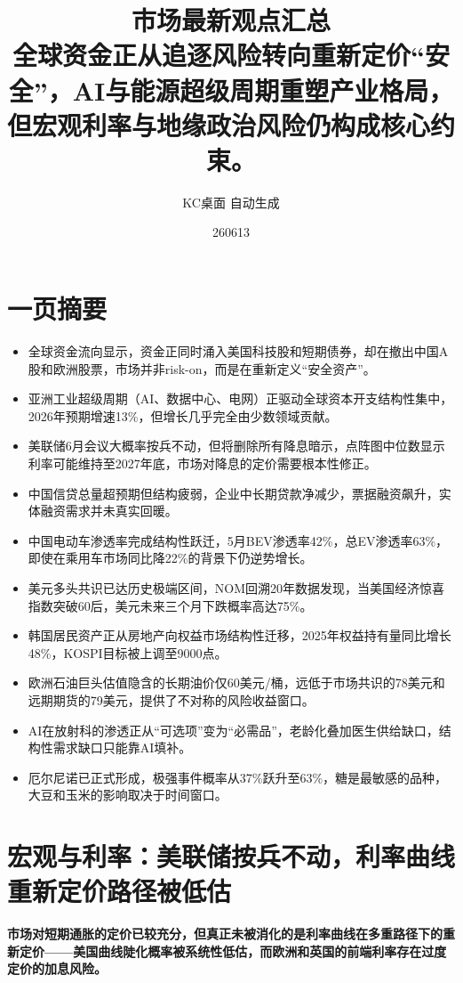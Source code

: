 \documentclass[11pt]{ctexart}
\title{\textbf{市场最新观点汇总}\\[0.4em]{\large 全球资金正从追逐风险转向重新定价“安全”，AI与能源超级周期重塑产业格局，但宏观利率与地缘政治风险仍构成核心约束。}}
\author{KC桌面 自动生成}
\date{260613}
\begin{document}
\maketitle
\tableofcontents
\newpage
\section{一页摘要}
\begin{itemize}
  \item 全球资金流向显示，资金正同时涌入美国科技股和短期债券，却在撤出中国A股和欧洲股票，市场并非risk-on，而是在重新定义“安全资产”。
  \item 亚洲工业超级周期（AI、数据中心、电网）正驱动全球资本开支结构性集中，2026年预期增速13\%，但增长几乎完全由少数领域贡献。
  \item 美联储6月会议大概率按兵不动，但将删除所有降息暗示，点阵图中位数显示利率可能维持至2027年底，市场对降息的定价需要根本性修正。
  \item 中国信贷总量超预期但结构疲弱，企业中长期贷款净减少，票据融资飙升，实体融资需求并未真实回暖。
  \item 中国电动车渗透率完成结构性跃迁，5月BEV渗透率42\%，总EV渗透率63\%，即使在乘用车市场同比降22\%的背景下仍逆势增长。
  \item 美元多头共识已达历史极端区间，NOM回溯20年数据发现，当美国经济惊喜指数突破60后，美元未来三个月下跌概率高达75\%。
  \item 韩国居民资产正从房地产向权益市场结构性迁移，2025年权益持有量同比增长48\%，KOSPI目标被上调至9000点。
  \item 欧洲石油巨头估值隐含的长期油价仅60美元/桶，远低于市场共识的78美元和远期期货的79美元，提供了不对称的风险收益窗口。
  \item AI在放射科的渗透正从“可选项”变为“必需品”，老龄化叠加医生供给缺口，结构性需求缺口只能靠AI填补。
  \item 厄尔尼诺已正式形成，极强事件概率从37\%跃升至63\%，糖是最敏感的品种，大豆和玉米的影响取决于时间窗口。
\end{itemize}
\section{宏观与利率：美联储按兵不动，利率曲线重新定价路径被低估}
\textbf{市场对短期通胀的定价已较充分，但真正未被消化的是利率曲线在多重路径下的重新定价——美国曲线陡化概率被系统性低估，而欧洲和英国的前端利率存在过度定价的加息风险。}
\end{document}
